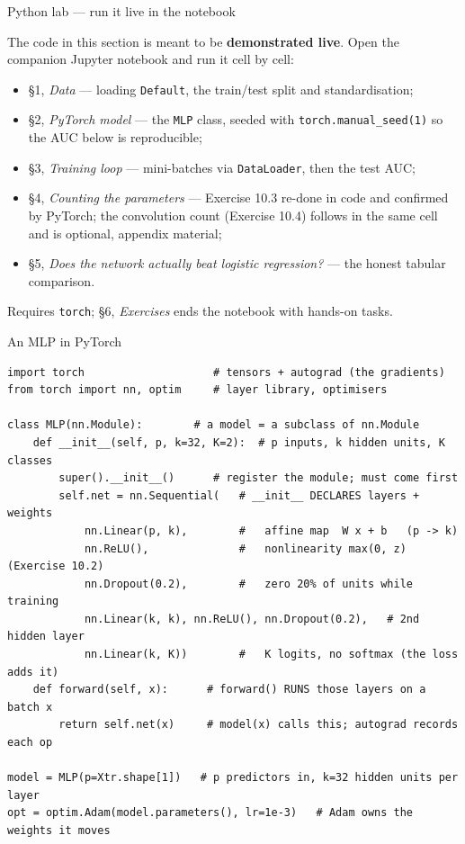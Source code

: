 \documentclass[aspectratio=169,11pt]{beamer}
\begin{document}
\begin{frame}{Python lab --- run it live in the notebook}
  \begin{labnote}
    The code in this section is meant to be \textbf{demonstrated live}. Open the companion Jupyter notebook and run it cell by cell:
    \begin{itemize}
      \item \S1, \emph{Data} --- loading \texttt{Default}, the train/test split and standardisation;
      \item \S2, \emph{PyTorch model} --- the \texttt{MLP} class, seeded with \texttt{torch.manual\_seed(1)} so the AUC below is reproducible;
      \item \S3, \emph{Training loop} --- mini-batches via \texttt{DataLoader}, then the test AUC;
      \item \S4, \emph{Counting the parameters} --- Exercise 10.3 re-done in code and confirmed by PyTorch; the convolution count (Exercise 10.4) follows in the same cell and is optional, appendix material;
      \item \S5, \emph{Does the network actually beat logistic regression?} --- the honest tabular comparison.
    \end{itemize}
    Requires \texttt{torch}; \S6, \emph{Exercises} ends the notebook with hands-on tasks.
  \end{labnote}
\end{frame}



\begin{frame}[fragile]{An MLP in PyTorch}
  \begin{lstlisting}
import torch                    # tensors + autograd (the gradients)
from torch import nn, optim     # layer library, optimisers

class MLP(nn.Module):        # a model = a subclass of nn.Module
    def __init__(self, p, k=32, K=2):  # p inputs, k hidden units, K classes
        super().__init__()      # register the module; must come first
        self.net = nn.Sequential(   # __init__ DECLARES layers + weights
            nn.Linear(p, k),        #   affine map  W x + b   (p -> k)
            nn.ReLU(),              #   nonlinearity max(0, z) (Exercise 10.2)
            nn.Dropout(0.2),        #   zero 20% of units while training
            nn.Linear(k, k), nn.ReLU(), nn.Dropout(0.2),   # 2nd hidden layer
            nn.Linear(k, K))        #   K logits, no softmax (the loss adds it)
    def forward(self, x):      # forward() RUNS those layers on a batch x
        return self.net(x)     # model(x) calls this; autograd records each op

model = MLP(p=Xtr.shape[1])   # p predictors in, k=32 hidden units per layer
opt = optim.Adam(model.parameters(), lr=1e-3)   # Adam owns the weights it moves
  \end{lstlisting}
\end{frame}
\end{document}
